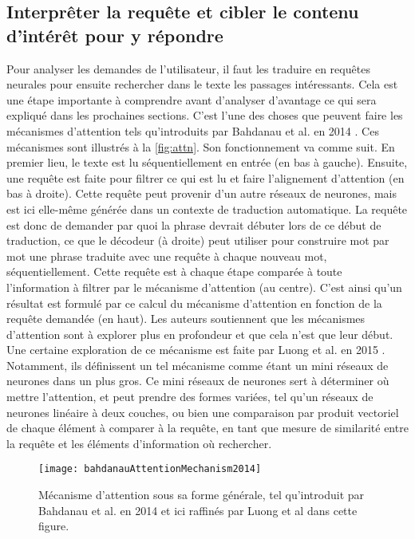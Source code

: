 \subsection{Interprêter la requête et cibler le contenu d'intérêt pour y répondre}

Pour analyser les demandes de l'utilisateur, il faut les traduire en requêtes neurales pour ensuite rechercher dans le texte les passages intéressants. Cela est une étape importante à comprendre avant d'analyser d'avantage ce qui sera expliqué dans les prochaines sections. C'est l'une des choses que peuvent faire les mécanismes d'attention tels qu'introduits par Bahdanau et al. en 2014 \cite{attentionMechanism}. Ces mécanismes sont illustrés à la \autoref{fig:attn}. Son fonctionnement va comme suit. En premier lieu, le texte est lu séquentiellement en entrée (en bas à gauche). Ensuite, une requête est faite pour filtrer ce qui est lu et faire l'alignement d'attention (en bas à droite). Cette requête peut provenir d'un autre réseaux de neurones, mais est ici elle-même générée dans un contexte de traduction automatique. La requête est donc de demander par quoi la phrase devrait débuter lors de ce début de traduction, ce que le décodeur (à droite) peut utiliser pour construire mot par mot une phrase traduite avec une requête à chaque nouveau mot, séquentiellement. Cette requête est à chaque étape comparée à toute l'information à filtrer par le mécanisme d'attention (au centre). C'est ainsi qu'un résultat est formulé par ce calcul du mécanisme d'attention en fonction de la requête demandée (en haut). Les auteurs soutiennent que les mécanismes d'attention sont à explorer plus en profondeur et que cela n'est que leur début. Une certaine exploration de ce mécanisme est faite par Luong et al. en 2015 \cite{attentionBasedApproaches}. Notamment, ils définissent un tel mécanisme comme étant un mini réseaux de neurones dans un plus gros. Ce mini réseaux de neurones sert à déterminer où mettre l'attention, et peut prendre des formes variées, tel qu'un réseaux de neurones linéaire à deux couches, ou bien une comparaison par produit vectoriel de chaque élément à comparer à la requête, en tant que mesure de similarité entre la requête et les éléments d'information où rechercher.

\begin{figure*}
  \centering
  \texttt{[image: bahdanauAttentionMechanism2014]}
  \caption{Mécanisme d'attention sous sa forme générale, tel qu'introduit par Bahdanau et al. en 2014 \cite{attentionMechanism} et ici raffinés par Luong et al \cite{attentionBasedApproaches} dans cette figure.}
  \label{fig:attn}
\end{figure*}

